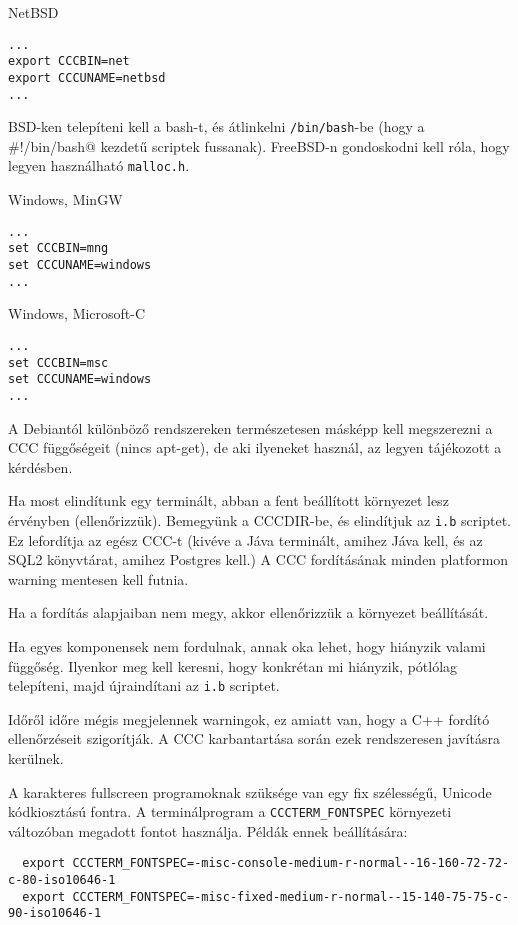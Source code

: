 NetBSD
\begin{verbatim}
...
export CCCBIN=net
export CCCUNAME=netbsd
...
\end{verbatim}

BSD-ken telepíteni kell a bash-t, és átlinkelni \verb!/bin/bash!-be (hogy a
\verb@#!/bin/bash@ kezdetű scriptek fussanak). FreeBSD-n gondoskodni kell róla,
hogy legyen használható \verb!malloc.h!.


Windows, MinGW
\begin{verbatim}
...
set CCCBIN=mng
set CCCUNAME=windows
...
\end{verbatim}

Windows, Microsoft-C
\begin{verbatim}
...
set CCCBIN=msc
set CCCUNAME=windows
...
\end{verbatim}

A Debiantól különböző rendszereken természetesen másképp kell megszerezni
a CCC függőségeit (nincs apt-get), de aki ilyeneket használ, 
az legyen tájékozott a kérdésben.

Ha most elindítunk egy terminált, abban a fent beállított környezet lesz érvényben
(ellenőrizzük). Bemegyünk a CCCDIR-be, és elindítjuk az \verb!i.b! scriptet. 
Ez lefordítja az egész CCC-t (kivéve a Jáva terminált, amihez Jáva kell, 
és az SQL2 könyvtárat, amihez Postgres kell.) 
A CCC fordításának minden platformon warning mentesen kell futnia.

Ha a fordítás alapjaiban nem megy, akkor ellenőrizzük a környezet beállítását.

Ha egyes komponensek nem fordulnak, annak oka lehet, hogy hiányzik valami
függőség. Ilyenkor meg kell keresni, hogy konkrétan mi hiányzik, pótlólag telepíteni,
majd újraindítani az \verb!i.b! scriptet.

Időről időre mégis megjelennek warningok, ez amiatt van, hogy a C++ fordító 
ellenőrzéseit szigorítják. A CCC karbantartása során ezek rendszeresen javításra 
kerülnek.

A karakteres fullscreen programoknak szüksége 
van egy fix szélességű, Unicode kódkiosztású fontra.
A terminálprogram a \verb!CCCTERM_FONTSPEC! környezeti változóban 
megadott fontot használja. Példák ennek beállítására:

\begin{verbatim}
  export CCCTERM_FONTSPEC=-misc-console-medium-r-normal--16-160-72-72-c-80-iso10646-1
  export CCCTERM_FONTSPEC=-misc-fixed-medium-r-normal--15-140-75-75-c-90-iso10646-1
\end{verbatim}

